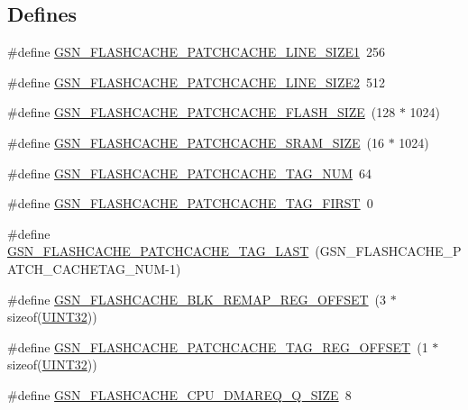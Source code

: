 \subsection*{Defines}
\begin{DoxyCompactItemize}
\item 
\#define \hyperlink{a00500_a8af8595e379f890168b49ba2376a87ce}{GSN\_\-FLASHCACHE\_\-PATCHCACHE\_\-LINE\_\-SIZE1}~256
\item 
\#define \hyperlink{a00500_afd0152a2c7a39f147acee0691804f5b8}{GSN\_\-FLASHCACHE\_\-PATCHCACHE\_\-LINE\_\-SIZE2}~512
\item 
\#define \hyperlink{a00500_af657535573b5a6523955a1e187345d0d}{GSN\_\-FLASHCACHE\_\-PATCHCACHE\_\-FLASH\_\-SIZE}~(128 $\ast$ 1024)
\item 
\#define \hyperlink{a00500_a3ed82b9373946674a9f90d538d304eac}{GSN\_\-FLASHCACHE\_\-PATCHCACHE\_\-SRAM\_\-SIZE}~(16 $\ast$ 1024)
\item 
\#define \hyperlink{a00500_a6d2c7c1c216f85daa43a7b75844df869}{GSN\_\-FLASHCACHE\_\-PATCHCACHE\_\-TAG\_\-NUM}~64
\item 
\#define \hyperlink{a00500_af3160a4e153bab80e59b398e9ea629b7}{GSN\_\-FLASHCACHE\_\-PATCHCACHE\_\-TAG\_\-FIRST}~0
\item 
\#define \hyperlink{a00500_a49b308aa9ae943d2cd70bf768959427e}{GSN\_\-FLASHCACHE\_\-PATCHCACHE\_\-TAG\_\-LAST}~(GSN\_\-FLASHCACHE\_\-PATCH\_\-CACHETAG\_\-NUM-\/1)
\item 
\#define \hyperlink{a00500_a6cf076bff36a8025789760126f41979c}{GSN\_\-FLASHCACHE\_\-BLK\_\-REMAP\_\-REG\_\-OFFSET}~(3 $\ast$ sizeof(\hyperlink{a00660_gae1e6edbbc26d6fbc71a90190d0266018}{UINT32}))
\item 
\#define \hyperlink{a00500_aed0d954ce7759195185a61a38f3c313c}{GSN\_\-FLASHCACHE\_\-PATCHCACHE\_\-TAG\_\-REG\_\-OFFSET}~(1 $\ast$ sizeof(\hyperlink{a00660_gae1e6edbbc26d6fbc71a90190d0266018}{UINT32}))
\item 
\#define \hyperlink{a00500_ab1c5953ab32b32e1274fe9053eff3839}{GSN\_\-FLASHCACHE\_\-CPU\_\-DMAREQ\_\-Q\_\-SIZE}~8
\end{DoxyCompactItemize}
